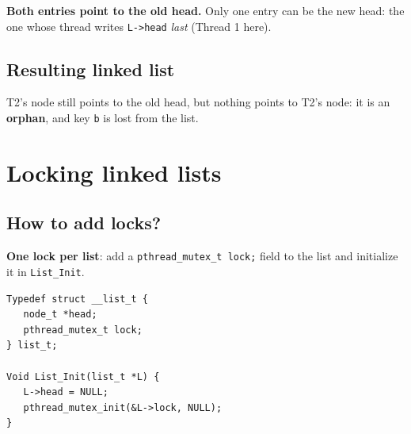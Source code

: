 \documentclass[11pt,a4paper]{article}
\begin{document}
\textbf{Both entries point to the old head.} Only one entry can be the new
head: the one whose thread writes \texttt{L->head} \emph{last} (Thread 1
here).

\subsection{Resulting linked list}

\begin{center}
\end{center}

T2's node still points to the old head, but nothing points to T2's node: it
is an \textbf{orphan}, and key \texttt{b} is lost from the list.

\section{Locking linked lists}

\subsection{How to add locks?}

\textbf{One lock per list}: add a \texttt{pthread\_mutex\_t lock;} field to
the list and initialize it in \texttt{List\_Init}.

\begin{lstlisting}
Typedef struct __list_t {
   node_t *head;
   pthread_mutex_t lock;
} list_t;

Void List_Init(list_t *L) {
   L->head = NULL;
   pthread_mutex_init(&L->lock, NULL);
}
\end{lstlisting}
\end{document}
